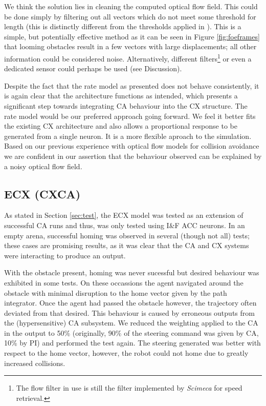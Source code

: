 \documentclass[a4paper,11pt,twoside,openright]{article}
\begin{document}
We think the solution lies in cleaning the computed optical flow
field. This could be done simply by filtering out all vectors which do
not meet some threshold for length (this is distinctly different from
the thresholds applied in \cite{Mitchell2018}). This is a simple, but
potentially effective method as it can be seen in Figure
\ref{fig:foeframes} that looming obstacles result in a few vectors
with large displacements; all other information could be considered
noise. Alternatively, different filters\footnote{The flow filter in
  use is still the filter implemented by \textit{Scimeca} for speed
  retrieval\cite{Scimeca2017,Mitchell2018}. } or even a dedicated
sensor could perhaps be used (see Discussion).\newline\par

Despite the fact that the rate model as presented does not behave
consistently, it is again clear that the architecture functions as
intended, which presents a significant step towards integrating CA
behaviour into the CX structure.  The rate model would be our
preferred approach going forward. We feel it better fits the existing
CX architecture and also allows a proportional response to be
generated from a single neuron. It is a more flexible aproach to the
simulation. Based on our previous experience with optical flow models
for collision avoidance we are confident in our assertion that the
behaviour observed can be explained by a noisy optical flow field.

\subsection{ECX (CXCA)}
As stated in Section \ref{sec:test}, the ECX model was tested as an
extension of successful CA runs and thus, was only tested using I\&F
ACC neurons. In an empty arena, successful homing was observed in
several (though not all) tests; these cases are promising results, as
it was clear that the CA and CX systems were interacting to produce an
output. \newline\par

With the obstacle present, homing was never sucessful but desired
behaviour was exhibited in some tests. On these occassions the agent
navigated around the obstacle with minimal disruption to the home
vector given by the path integrator. Once the agent had passed the
obstacle however, the trajectory often deviated from that
desired. This behaviour is caused by erroneous outputs from the
(hypersensitive) CA subsystem. We reduced the weighting applied to the
CA in the output to 50\% (originally, 90\% of the steering command was
given by CA, 10\% by PI) and performed the test again. The steering
generated was better with respect to the home vector, however, the
robot could not home due to greatly increased collisions.
\newline\par
\end{document}

